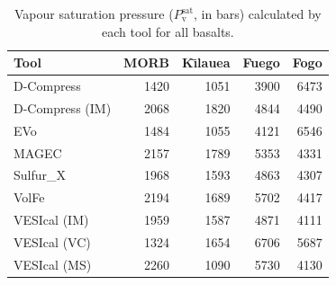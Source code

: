 \begin{table}
    \centering
    \begin{tabular}{lrrrr}
        Tool & MORB & K\={\i}lauea & Fuego & Fogo \\ \hline
        D-Compress & 1420 & 1051 & 3900 & 6473 \\
        D-Compress (IM) & 2068 & 1820 & 4844 & 4490 \\
        EVo & 1484 & 1055 & 4121 & 6546 \\
        MAGEC & 2157 & 1789 & 5353 & 4331 \\
        Sulfur\_X & 1968 & 1593 & 4863 & 4307 \\
        VolFe & 2194 & 1689 & 5702 & 4417 \\
        VESIcal (IM) & 1959 & 1587 & 4871 & 4111 \\
        VESIcal (VC) & 1324 & 1654 & 6706 & 5687 \\
        VESIcal (MS) & 2260 & 1090 & 5730 & 4130 \\
    \hline
    \end{tabular}
    \caption{Vapour saturation pressure ($P_\mathrm{v}^\mathrm{sat}$, in bars) calculated by each tool for all basalts.}
    \label{table:SatP}
\end{table}
